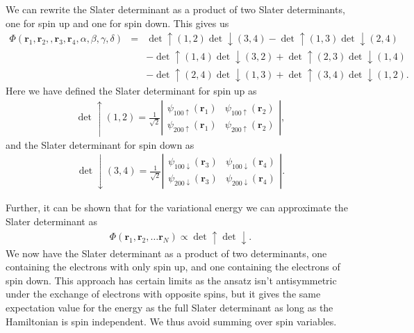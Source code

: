 		We can rewrite the Slater determinant as a product of two Slater
		determinants, one for spin up and one for spin down. This gives us 
		\begin{eqnarray*}
			\Phi(\mathbf{r}_{1},\mathbf{r}_{2},,\mathbf{r}_{3},\mathbf{r}_{4},\alpha,\beta,\gamma,\delta) & = & \det\uparrow(1,2)\det\downarrow(3,4)-\det\uparrow(1,3)\det\downarrow(2,4)\\
	 		&  & -\det\uparrow(1,4)\det\downarrow(3,2)+\det\uparrow(2,3)\det\downarrow(1,4)\\
	 		&  & -\det\uparrow(2,4)\det\downarrow(1,3)+\det\uparrow(3,4)\det\downarrow(1,2).
		\end{eqnarray*}
		Here we have defined the Slater determinant for spin up as
		\begin{align}
			\det\uparrow(1,2)=\frac{1}{\sqrt{2}}\left|\begin{array}{cc}
			\psi_{100\uparrow}(\mathbf{r}_{1}) & \psi_{100\uparrow}(\mathbf{r}_{2})\\
			\psi_{200\uparrow}(\mathbf{r}_{1}) & \psi_{200\uparrow}(\mathbf{r}_{2})
			\end{array}\right|,
		\end{align}
		and the Slater determinant for spin down as
		\begin{align}
			\det\downarrow(3,4)=\frac{1}{\sqrt{2}}\left|\begin{array}{cc}
			\psi_{100\downarrow}(\mathbf{r}_{3}) & \psi_{100\downarrow}(\mathbf{r}_{4})\\
			\psi_{200\downarrow}(\mathbf{r}_{3}) & \psi_{200\downarrow}(\mathbf{r}_{4})
			\end{array}\right|.
		\end{align}

		Further, it can be shown that for the variational energy we can approximate
		the Slater determinant as \cite{moskowitz1981}
		\begin{align}
			\Phi(\mathbf{r}_{1},\mathbf{r}_{2},\dots\mathbf{r}_{N})\propto\det\uparrow\det\downarrow.
		\end{align}
		We now have the Slater determinant as a product of two determinants,
		one containing the electrons with only spin up, and one containing
		the electrons of spin down. This approach has certain limits as the
		ansatz isn't antisymmetric under the exchange of electrons with opposite
		spins, but it gives the same expectation value for the energy as the
		full Slater determinant as long as the Hamiltonian is spin independent.
		We thus avoid summing over spin variables.

